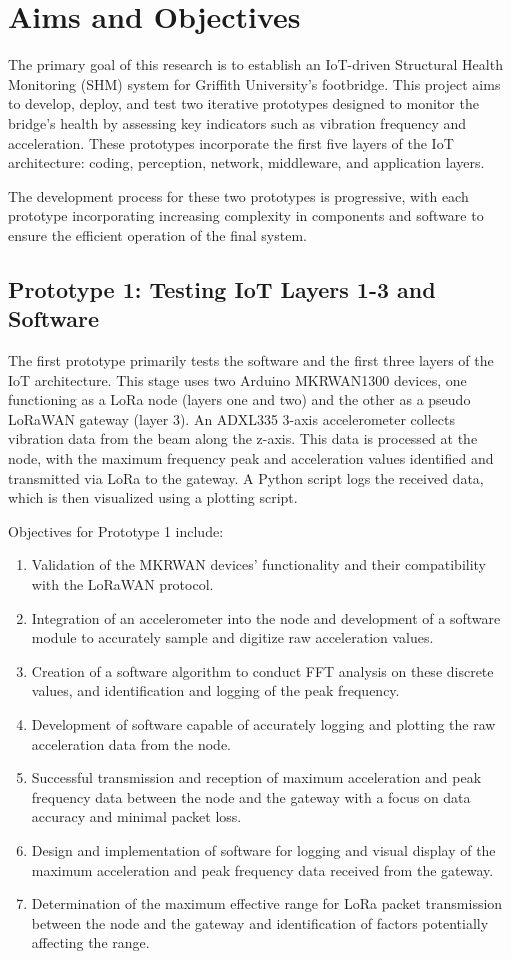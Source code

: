 \section{Aims and Objectives}

The primary goal of this research is to establish an IoT-driven Structural Health Monitoring (SHM) system for Griffith University's footbridge. This project aims to develop, deploy, and test two iterative prototypes designed to monitor the bridge's health by assessing key indicators such as vibration frequency and acceleration. These prototypes incorporate the first five layers of the IoT architecture: coding, perception, network, middleware, and application layers.

The development process for these two prototypes is progressive, with each prototype incorporating increasing complexity in components and software to ensure the efficient operation of the final system.

\subsection{Prototype 1: Testing IoT Layers 1-3 and Software} 

The first prototype primarily tests the software and the first three layers of the IoT architecture. This stage uses two Arduino MKRWAN1300 devices, one functioning as a LoRa node (layers one and two) and the other as a pseudo LoRaWAN gateway (layer 3). An ADXL335 3-axis accelerometer collects vibration data from the beam along the z-axis. This data is processed at the node, with the maximum frequency peak and acceleration values identified and transmitted via LoRa to the gateway. A Python script logs the received data, which is then visualized using a plotting script.

Objectives for Prototype 1 include:

\begin{enumerate}
\item Validation of the MKRWAN devices' functionality and their compatibility with the LoRaWAN protocol.
\item Integration of an accelerometer into the node and development of a software module to accurately sample and digitize raw acceleration values.
\item Creation of a software algorithm to conduct FFT analysis on these discrete values, and identification and logging of the peak frequency.
\item Development of software capable of accurately logging and plotting the raw acceleration data from the node.
\item Successful transmission and reception of maximum acceleration and peak frequency data between the node and the gateway with a focus on data accuracy and minimal packet loss.
\item Design and implementation of software for logging and visual display of the maximum acceleration and peak frequency data received from the gateway.
\item Determination of the maximum effective range for LoRa packet transmission between the node and the gateway and identification of factors potentially affecting the range.
\end{enumerate}

